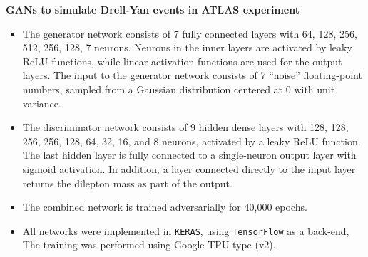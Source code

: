 \documentclass[11pt,aspectratio=169]{beamer}
\begin{document}
\begin{frame}{\underline{\secname}}
	
	\begin{center}
		\textbf{GANs to simulate Drell-Yan events in  ATLAS experiment}
	\end{center}
			\begin{itemize}			  \setlength\itemsep{0em}
\item
	
	The generator network consists of 7 fully connected layers with 64, 128, 256, 512, 256, 128, 7 neurons. Neurons in the inner layers are activated by leaky ReLU functions, while linear activation functions are used for the output layers. The input to the generator network consists of 7 ``noise'' floating-point numbers, sampled from a Gaussian distribution centered at 0 with unit variance. 
	
	\item

	The discriminator network consists of 9 hidden dense layers with 128, 128, 256, 256, 128, 64, 32, 16, and 8 neurons, activated by a leaky ReLU function. The last hidden layer is fully connected to a single-neuron output layer with sigmoid activation. In addition, a layer connected directly to the input layer returns the dilepton mass as part of the output.
	
\item

The combined network is trained adversarially for 40,000 epochs.

\item

All networks were implemented in {\tt KERAS}, using {\tt TensorFlow} as a back-end, The training was performed using Google TPU type (v2).	
	
				\end{itemize}

 \end{frame}

 
 
\end{document}
